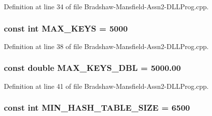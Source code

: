 Definition at line 34 of file Bradshaw-\/Mansfield-\/Assn2-\/DLLProg.cpp.

\hypertarget{_bradshaw-_mansfield-_assn2-_d_l_l_prog_8cpp_ad2624222b2a41e40f795baff70c1d20c}{
\subsubsection[{MAX\_\-KEYS}]{\setlength{\rightskip}{0pt plus 5cm}const int {\bf MAX\_\-KEYS} = 5000}}
\label{_bradshaw-_mansfield-_assn2-_d_l_l_prog_8cpp_ad2624222b2a41e40f795baff70c1d20c}


Definition at line 38 of file Bradshaw-\/Mansfield-\/Assn2-\/DLLProg.cpp.

\hypertarget{_bradshaw-_mansfield-_assn2-_d_l_l_prog_8cpp_a3a0ca86f28ff2c4d31143f5f3d6ca40a}{
\subsubsection[{MAX\_\-KEYS\_\-DBL}]{\setlength{\rightskip}{0pt plus 5cm}const double {\bf MAX\_\-KEYS\_\-DBL} = 5000.00}}
\label{_bradshaw-_mansfield-_assn2-_d_l_l_prog_8cpp_a3a0ca86f28ff2c4d31143f5f3d6ca40a}


Definition at line 41 of file Bradshaw-\/Mansfield-\/Assn2-\/DLLProg.cpp.

\hypertarget{_bradshaw-_mansfield-_assn2-_d_l_l_prog_8cpp_a92e00f871716652e494af2741a4794bd}{
\subsubsection[{MIN\_\-HASH\_\-TABLE\_\-SIZE}]{\setlength{\rightskip}{0pt plus 5cm}const int {\bf MIN\_\-HASH\_\-TABLE\_\-SIZE} = 6500}}
\label{_bradshaw-_mansfield-_assn2-_d_l_l_prog_8cpp_a92e00f871716652e494af2741a4794bd}


